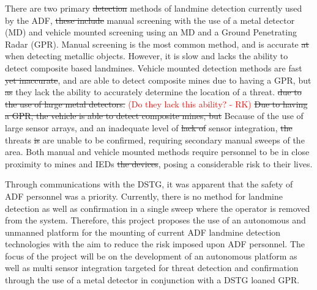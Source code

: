 \documentclass[main.tex]{subfiles}
\begin{document}
There are two primary \sout{detection} methods of landmine detection currently used by the ADF, \sout{these include} manual screening with the use of a metal detector (MD) and vehicle mounted screening using an MD and a Ground Penetrating Radar (GPR). Manual screening is the most common method, and is accurate \sout{at} when detecting metallic objects. However, it is slow and lacks the ability to detect composite based landmines. Vehicle mounted detection methods are fast \sout{yet inaccurate}, and are able to detect composite mines due to having a GPR, but \sout{as} they lack the ability to accurately determine the location of a threat. \sout{due to the use of large metal detectors.}
\textcolor{red}{(Do they lack this ability? - RK)}
\sout{Due to having a GPR, the vehicle is able to detect composite mines, but} Because of the use of large sensor arrays, and an inadequate level of \sout{lack of} sensor integration, \sout{the} threats \sout{is} are unable to be confirmed, requiring secondary manual sweeps of the area. Both manual and vehicle mounted methods require personnel to be in close proximity to mines and IEDs \sout{the devices}, posing a considerable risk to their lives. %
\\
%
%

Through communications with the DSTG, it was apparent that the safety of ADF personnel  was a priority. Currently, there is no method for landmine detection as well as confirmation in a single sweep where the operator is removed from the system. Therefore, this project proposes the use of an autonomous and unmanned platform for the mounting of current ADF landmine detection technologies with the aim to reduce the risk imposed upon ADF personnel. The focus of the project will be on the development of an autonomous platform as well as multi sensor integration targeted for threat detection and confirmation through the use of a metal detector in conjunction with a DSTG loaned GPR.
\\

\end{document}
